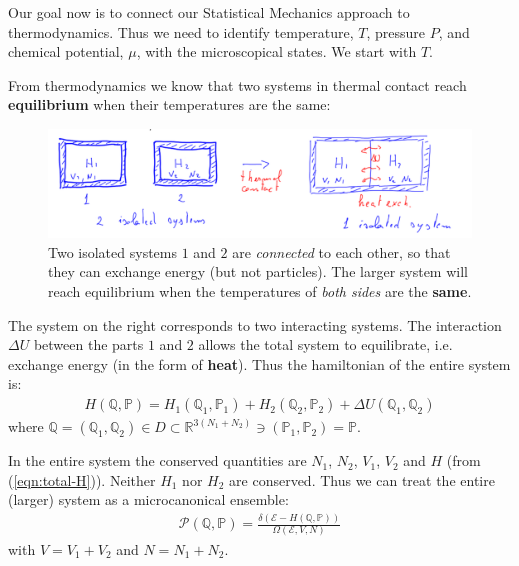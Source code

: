 \documentclass[../template.tex]{subfiles}
\begin{document}
\medskip

Our goal now is to connect our Statistical Mechanics approach to thermodynamics. Thus we need to identify temperature, $T$, pressure $P$, and chemical potential, $\mu$, with the microscopical states. We start with $T$.

\medskip

From thermodynamics we know that two systems in thermal contact reach \textbf{equilibrium} when their temperatures are the same: 

\begin{figure}[htp]
    \centering
    \includegraphics{image003.png}
    \caption{Two isolated systems $1$ and $2$ are \textit{connected} to each other, so that they can exchange energy (but not particles). The larger system will reach equilibrium when the temperatures of \textit{both sides} are the \textbf{same}.\label{fig:thermal-equilibrium}}
\end{figure}

The system on the right corresponds to two interacting systems. The interaction $\Delta U$ between the parts $1$ and $2$ allows the total system to equilibrate, i.e. exchange energy (in the form of \textbf{heat}). Thus the hamiltonian of the entire system is:
\begin{align}\label{eqn:total-H}
    H(\mathbb{Q},\mathbb{P}) = H_1(\mathbb{Q}_1, \mathbb{P}_1) + H_2(\mathbb{Q}_2, \mathbb{P}_2) + \Delta U(\mathbb{Q}_1, \mathbb{Q}_2)
\end{align}
where $\mathbb{Q} = (\mathbb{Q}_1, \mathbb{Q}_2) \in D \subset \mathbb{R}^{3(N_1+N_2)} \ni (\mathbb{P}_1, \mathbb{P}_2) = \mathbb{P}$.

\medskip

In the entire system the conserved quantities are $N_1$, $N_2$, $V_1$, $V_2$ and $H$ (from (\ref{eqn:total-H})). Neither $H_1$ nor $H_2$ are conserved. Thus we can treat the entire (larger) system as a microcanonical ensemble:
\begin{align*}
    \mathcal{P}(\mathbb{Q},\mathbb{P}) = \frac{\delta (\mathcal{E}-H(\mathbb{Q},\mathbb{P}))}{\Omega (\mathcal{E}, V, N)} 
\end{align*}
with $V=V_1 + V_2$ and $N=N_1+N_2$.
\end{document}
